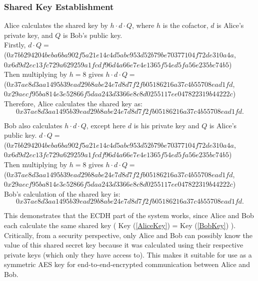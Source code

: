 \documentclass[12pt,a4paper]{article}
\begin{document}
\subsubsection{Shared Key Establishment} \noindent
Alice calculates the shared key by $h \cdot d \cdot Q$, 
where $h$ is the cofactor, $d$ is Alice's private key, and $Q$ is Bob's public key. \\
Firstly, $d \cdot Q = $\\
({\footnotesize $0x7bb294204beba6ba902f5a21e14c4d5abc953d52b79be70377104f72de310a4a$}, \\
{\footnotesize $0x6d9d2ec13fc729a629259a1fcdf96d4a66e7e4e1365f54ed5fa56e235bc74b5$}) \\
Then multiplying by $h = 8$ gives $h \cdot d \cdot Q = $\\
({\footnotesize $0x37ae8d3aa1495b39ead29b8abe24e7d8d7f2fb05186216a37c4b55708ead1fd$}, \\
{\footnotesize $0x29aecf95ba814e3e52866f5daa243d3366e8c8d0255117ee047822319b44222c$}) \\
Therefore, Alice calculates the shared key as: 
\begin{equation} \label{AliceKey}
    0x37ae8d3aa1495b39ead29b8abe24e7d8d7f2fb05186216a37c4b55708ead1fd.
\end{equation}

Bob also calculates $h \cdot d \cdot Q$, except here $d$ is his private key and $Q$ is Alice's public key. 
$d \cdot Q = $ \\
({\footnotesize $0x7bb294204beba6ba902f5a21e14c4d5abc953d52b79be70377104f72de310a4a$}, \\
{\footnotesize $0x6d9d2ec13fc729a629259a1fcdf96d4a66e7e4e1365f54ed5fa56e235bc74b5$}) \\
Then multiplying by $h = 8$ gives $h \cdot d \cdot Q = $\\
({\footnotesize $0x37ae8d3aa1495b39ead29b8abe24e7d8d7f2fb05186216a37c4b55708ead1fd$}, \\
{\footnotesize $0x29aecf95ba814e3e52866f5daa243d3366e8c8d0255117ee047822319b44222c$}) \\
Bob's calculation of the shared key is: 
\begin{equation} \label{BobKey}
    0x37ae8d3aa1495b39ead29b8abe24e7d8d7f2fb05186216a37c4b55708ead1fd.
\end{equation}

This demonstrates that the ECDH part of the system works, since Alice and Bob each calculate the same shared key ( Key (\ref{AliceKey}) = Key (\ref{BobKey}) ). 
Critically, from a security perspective, only Alice and Bob can possibly know the value of this shared secret key 
because it was calculated using their respective private keys (which only they have access to). 
This makes it suitable for use as a symmetric AES key for end-to-end-encrypted communication between Alice and Bob. 
\end{document}
